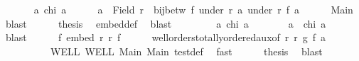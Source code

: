 \begin{isabellebody}
\ \ \ \ \isamarkupfalse%
\ {\isachardoublequoteopen}{\isasymnot}\ {\isacharparenleft}{\kern0pt}{\isasymexists}a{\isachardot}{\kern0pt}\ {\isacharquery}{\kern0pt}chi\ a{\isacharparenright}{\kern0pt}{\isachardoublequoteclose}\isanewline
\ \ \ \ \isamarkupfalse%
\ {\isachardoublequoteopen}{\isasymforall}a\ {\isasymin}\ Field\ r{\isachardot}{\kern0pt}\ \ bij{\isacharunderscore}{\kern0pt}betw\ f\ {\isacharparenleft}{\kern0pt}under\ r\ a{\isacharparenright}{\kern0pt}\ {\isacharparenleft}{\kern0pt}under\ r{\isacharprime}{\kern0pt}\ {\isacharparenleft}{\kern0pt}f\ a{\isacharparenright}{\kern0pt}{\isacharparenright}{\kern0pt}{\isachardoublequoteclose}\isanewline
\ \ \ \ \isamarkupfalse%
\ Main{}\ \isamarkupfalse%
\ blast\isanewline
\ \ \ \ \isamarkupfalse%
\ {\isacharquery}{\kern0pt}thesis\ \isamarkupfalse%
\ embed{\isacharunderscore}{\kern0pt}def\ \isamarkupfalse%
\ blast\isanewline
\ \ \isamarkupfalse%
\isanewline
\ \ \ \ \isamarkupfalse%
\ {\isachardoublequoteopen}{\isasymexists}a{\isachardot}{\kern0pt}\ {\isacharquery}{\kern0pt}chi\ a{\isachardoublequoteclose}\isanewline
\ \ \ \ \isamarkupfalse%
\ \isamarkupfalse%
\ a\ \ {\isachardoublequoteopen}{\isacharquery}{\kern0pt}chi\ a{\isachardoublequoteclose}\ \isamarkupfalse%
\ blast\isanewline
\ \ \ \ \isamarkupfalse%
\ {\isachardoublequoteopen}{\isasymexists}f{\isacharprime}{\kern0pt}{\isachardot}{\kern0pt}\ embed\ r{\isacharprime}{\kern0pt}\ r\ f{\isacharprime}{\kern0pt}{\isachardoublequoteclose}\isanewline
\ \ \ \ \isamarkupfalse%
\ wellorders{\isacharunderscore}{\kern0pt}totally{\isacharunderscore}{\kern0pt}ordered{\isacharunderscore}{\kern0pt}aux{}{\isacharbrackleft}{\kern0pt}of\ r\ r{\isacharprime}{\kern0pt}\ g\ f\ a{\isacharbrackright}{\kern0pt}\isanewline
\ \ \ \ \ \ \ \ \ \ WELL\ WELL{\isacharprime}{\kern0pt}\ Main{}\ Main{}\ test{\isacharunderscore}{\kern0pt}def\ \isamarkupfalse%
\ fast\isanewline
\ \ \ \ \isamarkupfalse%
\ {\isacharquery}{\kern0pt}thesis\ \isamarkupfalse%
\ blast\isanewline
\ \ \isamarkupfalse%
\isanewline
{}\isamarkupfalse%
%
\endisatagproof
{\isafoldproof}%
%
\isadelimproof
%
\endisadelimproof
%
\isadelimdocument
%
\endisadelimdocument
%
\isatagdocument
%
\end{isabellebody}

